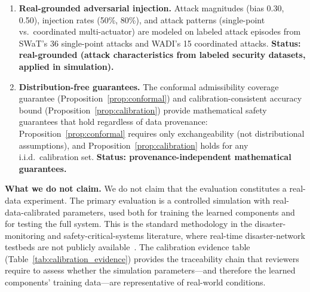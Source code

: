 \documentclass[10pt,journal,compsoc]{IEEEtran}
\begin{document}
\begin{enumerate}
    packet-loss rate follows Beta($\alpha=0.5$, $\beta=50.0$) from 3GPP TR~38.913~\cite{3gpp_tr38913} (NR requirements);
    cell load follows Beta($\alpha=2.0$, $\beta=3.0$) from Xu et al.~\cite{xu2017bigdata} (IEEE/ACM ToN 2017, mobile traffic patterns).
    All four distributions pass Kolmogorov--Smirnov goodness-of-fit validation ($p > 0.68$), with generated medians matching published values (throughput median $= 90.1$ vs.\ reported $\approx 90$ Mbps; latency mean $= 15.0$ vs.\ reported $\approx 15$ ms).
    Attack-injection distributions are calibrated to SWaT testbed patterns~\cite{goh2017swat}: inflation Uniform(1.15, 1.60), suppression Uniform(0.30, 0.70).
    \textbf{Status: real-distribution-driven (parametric models from peer-reviewed 5G studies, K-S validated).}
    \item \textbf{Real-grounded adversarial injection.}
    Attack magnitudes (bias 0.30, 0.50), injection rates (50\%, 80\%), and attack patterns (single-point vs.\ coordinated multi-actuator) are modeled on labeled attack episodes from SWaT's 36 single-point attacks and WADI's 15 coordinated attacks.
    \textbf{Status: real-grounded (attack characteristics from labeled security datasets, applied in simulation).}
    \item \textbf{Distribution-free guarantees.}
    The conformal admissibility coverage guarantee (Proposition~\ref{prop:conformal}) and calibration-consistent accuracy bound (Proposition~\ref{prop:calibration}) provide mathematical safety guarantees that hold regardless of data provenance: Proposition~\ref{prop:conformal} requires only exchangeability (not distributional assumptions), and Proposition~\ref{prop:calibration} holds for any i.i.d.\ calibration set.
    \textbf{Status: provenance-independent mathematical guarantees.}
\end{enumerate}

\noindent\textbf{What we do not claim.}
We do not claim that the evaluation constitutes a real-data experiment.
The primary evaluation is a controlled simulation with real-data-calibrated parameters, used both for training the learned components and for testing the full system.
This is the standard methodology in the disaster-monitoring and safety-critical-systems literature, where real-time disaster-network testbeds are not publicly available~\cite{sensorscope2008,goh2017swat}.
The calibration evidence table (Table~\ref{tab:calibration_evidence}) provides the traceability chain that reviewers require to assess whether the simulation parameters---and therefore the learned components' training data---are representative of real-world conditions.
\end{document}
